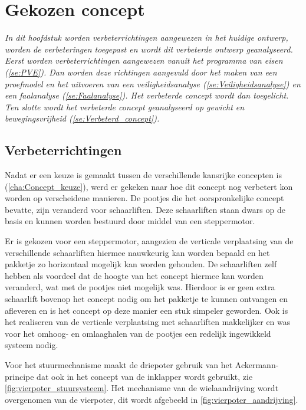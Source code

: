 \chapter{Gekozen concept}
\label{cha:gekozenConcept}

\textit{In dit hoofdstuk worden verbeterrichtingen aangewezen in het huidige ontwerp, worden de verbeteringen toegepast en wordt dit verbeterde ontwerp  geanalyseerd. Eerst worden verbeterrichtingen aangewezen vanuit het programma van eisen (\cref{se:PVE}). Dan worden deze richtingen aangevuld door het maken van een proefmodel en het uitvoeren van een veiligheidsanalyse (\ref{se:Veiligheidsanalyse}) en een faalanalyse (\cref{se:Faalanalyse}). Het verbeterde concept wordt dan toegelicht. Ten slotte wordt het verbeterde concept geanalyseerd op gewicht en bewegingsvrijheid (\cref{se:Verbeterd_concept}).}


\section{Verbeterrichtingen}
 Nadat er een keuze is gemaakt tussen de verschillende kansrijke concepten is (\cref{cha:Concept_keuze}), werd er gekeken naar hoe dit concept nog verbetert kon worden op verscheidene manieren. De pootjes die het oorspronkelijke concept bevatte, zijn veranderd voor schaarliften. Deze schaarliften staan dwars op de basis en kunnen worden bestuurd door middel van een steppermotor. 
 
 Er is gekozen voor een steppermotor, aangezien de verticale verplaatsing van de verschillende schaarliften hiermee nauwkeurig kan worden bepaald en het pakketje zo horizontaal mogelijk kan worden gehouden. De schaarliften zelf hebben als voordeel dat de hoogte van het concept hiermee kan worden veranderd, wat met de pootjes niet mogelijk was. Hierdoor is er geen extra schaarlift bovenop het concept nodig om het pakketje te kunnen ontvangen en afleveren en is het concept op deze manier een stuk simpeler geworden. Ook is het realiseren van de verticale verplaatsing met schaarliften makkelijker en was voor het omhoog- en omlaaghalen van de pootjes een redelijk ingewikkeld systeem nodig. 
 
 Voor het stuurmechanisme maakt de driepoter gebruik van het Ackermann-principe dat ook in het concept van de inklapper wordt gebruikt, zie \cref{fig:vierpoter_stuursysteem}. Het mechanisme van de wielaandrijving wordt overgenomen van de vierpoter, dit wordt afgebeeld in \cref{fig:vierpoter_aandrijving}. 
 
